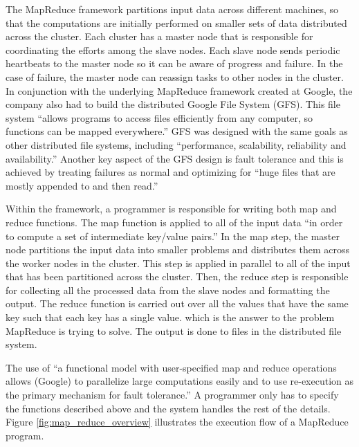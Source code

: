 \documentclass{report}
\begin{document}
The MapReduce framework partitions input data across different machines, so
that the computations are initially performed on smaller sets of data
distributed across the cluster. Each cluster has a master node that is
responsible for coordinating the efforts among the slave nodes. Each slave node
sends periodic heartbeats to the master node so it can be aware of progress and
failure. In the case of failure, the master node can reassign tasks to other
nodes in the cluster. In conjunction with the underlying MapReduce framework
created at Google, the company also had to build the distributed Google File
System (GFS). This file system ``allows programs to access files efficiently
from any computer, so functions can be mapped
everywhere.''\cite{patterson:2008} GFS was designed with the same goals as
other distributed file systems, including ``performance, scalability,
reliability and availability.''\cite{ghemawat:2003} Another key aspect of the
GFS design is fault tolerance and this is achieved by treating failures as
normal and optimizing for ``huge files that are mostly appended to and then
read.''\cite{ghemawat:2003}

Within the framework, a programmer is responsible for writing both map and
reduce functions. The map function is applied to all of the input data ``in
order to compute a set of intermediate key/value pairs.''\cite{dean:2004} In
the map step, the master node partitions the input data into smaller problems
and distributes them across the worker nodes in the cluster. This step is
applied in parallel to all of the input that has been partitioned across the
cluster. Then, the reduce step is responsible for collecting all the processed
data from the slave nodes and formatting the output. The reduce function is
carried out over all the values that have the same key such that each key has a
single value. which is the answer to the problem MapReduce is trying to solve.
The output is done to files in the distributed file system.

The use of ``a functional model with user-specified map and reduce operations
allows (Google) to parallelize large computations easily and to use
re-execution as the primary mechanism for fault tolerance.''\cite{dean:2004} A
programmer only has to specify the functions described above and the system
handles the rest of the details. Figure \ref{fig:map_reduce_overview}
illustrates the execution flow of a MapReduce program.
\end{document}
